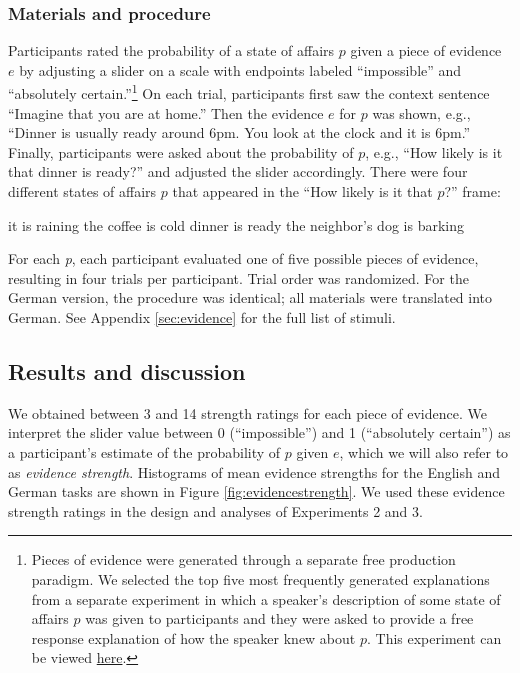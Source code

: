 \documentclass[11pt]{article}
\newcommand{\figref}[1]{Figure \ref{#1}}
\newcommand{\appref}[1]{Appendix \ref{#1}}
\begin{document}
\subsubsection{Materials and procedure}

Participants rated the probability of a state of affairs $p$ given a piece of evidence $e$ by adjusting a slider on a scale with endpoints labeled ``impossible'' and ``absolutely certain.''\footnote{Pieces of evidence were generated through a separate free production paradigm. We selected the top five most frequently generated explanations from a separate experiment in which a speaker's description of some state of affairs $p$ was given to participants and they were asked to provide a free response explanation of how the speaker knew about $p$. This experiment can be viewed \href{http://stanford.edu/~jdegen/68_modals_freeproduction/modals.html}{here}.} On each trial, participants first saw the context sentence ``Imagine that you are at home.'' Then the evidence $e$ for $p$ was shown, e.g., ``Dinner is usually ready around 6pm. You look at the clock and it is 6pm.'' Finally, participants were asked about the probability of $p$, e.g., ``How likely is it that dinner is ready?'' and adjusted the slider accordingly. There were four different states of affairs $p$ that appeared in the ``How likely is it that $p$?'' frame:

\begin{exe}
\ex
\begin{xlist}
	\ex it is raining
	\ex the coffee is cold
	\ex dinner is ready
	\ex the neighbor's dog is barking
	\end{xlist}
\end{exe}

For each \emph{p}, each participant evaluated one of five possible pieces of evidence, resulting in four trials per participant. Trial order was randomized. 
For the German version, the procedure was identical; all materials were translated into German. See \appref{sec:evidence} for the full list of stimuli.

\subsection{Results and discussion}

We obtained between 3 and 14 strength ratings for each piece of evidence. We interpret the slider value between 0 (``impossible'') and 1 (``absolutely certain'') as a participant's estimate of the probability of $p$ given $e$, which we will also refer to as  \emph{evidence strength}. Histograms of mean evidence strengths for the English and German tasks are shown in \figref{fig:evidencestrength}.  We used these evidence strength ratings in the design and analyses of Experiments 2 and 3.
\end{document}
